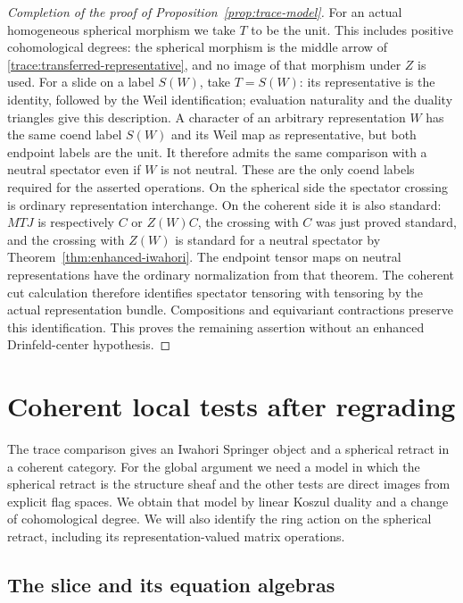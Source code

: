 \documentclass[11pt]{article}
\numberwithin{equation}{section}
\theoremstyle{definition}
\theoremstyle{remark}
\begin{document}
\begin{proof}[Completion of the proof of Proposition~\ref{prop:trace-model}]
For an actual homogeneous spherical morphism we take $T$ to be the
unit.  This includes positive cohomological degrees: the spherical
morphism is the middle arrow of
\eqref{trace:transferred-representative}, and no image of that
morphism under $Z$ is used.  For a slide on a label $S(W)$,
take $T=S(W)$: its representative is the identity, followed by the
Weil identification; evaluation naturality and the duality triangles
give this description.  A character of an arbitrary representation
$W$ has the same coend label $S(W)$ and its Weil map as representative,
but both endpoint labels are the unit.  It therefore admits the same
comparison with a neutral spectator even if $W$ is not neutral.
These are the only coend labels required for
the asserted operations.  On the spherical side the spectator
crossing is ordinary representation interchange.  On the coherent
side it is also standard: $MTJ$ is respectively $C$ or $Z(W)C$,
the crossing with $C$ was just proved standard, and the crossing with
$Z(W)$ is standard for a neutral spectator by
Theorem~\ref{thm:enhanced-iwahori}.  The endpoint tensor maps on
neutral representations have the ordinary normalization from that
theorem.  The coherent cut calculation therefore identifies
spectator tensoring with tensoring by the actual representation
bundle.  Compositions and equivariant contractions preserve this
identification.  This proves the remaining assertion without an
enhanced Drinfeld-center hypothesis.
\end{proof}


\section{Coherent local tests after regrading}
\label{sec:local-models}

The trace comparison gives an Iwahori Springer object and a spherical
retract in a coherent category.  For the global argument we need a
model in which the spherical retract is the structure sheaf and the
other tests are direct images from explicit flag spaces.  We obtain
that model by linear Koszul duality and a change of cohomological
degree.  We will also identify the ring action on the spherical
retract, including its representation-valued matrix operations.

\subsection{The slice and its equation algebras}
\label{local:subsec-slice}
\end{document}
